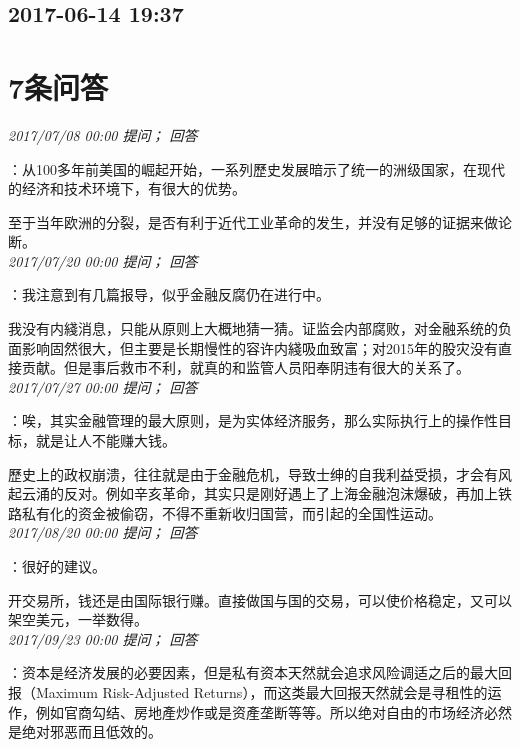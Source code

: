 \documentclass[twocolumn]{ctexart}
\begin{document}
\subsection{2017-06-14 19:37}


\section{7条问答}

\textit{\hfill\noindent\small 2017/07/08 00:00 提问； 回答}

：从100多年前美国的崛起开始，一系列歷史发展暗示了统一的洲级国家，在现代的经济和技术环境下，有很大的优势。

至于当年欧洲的分裂，是否有利于近代工业革命的发生，并没有足够的证据来做论断。\\

\textit{\hfill\noindent\small 2017/07/20 00:00 提问； 回答}

：我注意到有几篇报导，似乎金融反腐仍在进行中。

我没有内綫消息，只能从原则上大概地猜一猜。证监会内部腐败，对金融系统的负面影响固然很大，但主要是长期慢性的容许内綫吸血致富；对2015年的股灾没有直接贡献。但是事后救市不利，就真的和监管人员阳奉阴违有很大的关系了。\\

\textit{\hfill\noindent\small 2017/07/27 00:00 提问； 回答}

：唉，其实金融管理的最大原则，是为实体经济服务，那么实际执行上的操作性目标，就是让人不能赚大钱。

歷史上的政权崩溃，往往就是由于金融危机，导致士绅的自我利益受损，才会有风起云涌的反对。例如辛亥革命，其实只是刚好遇上了上海金融泡沫爆破，再加上铁路私有化的资金被偷窃，不得不重新收归国营，而引起的全国性运动。\\

\textit{\hfill\noindent\small 2017/08/20 00:00 提问； 回答}

：很好的建议。

开交易所，钱还是由国际银行赚。直接做国与国的交易，可以使价格稳定，又可以架空美元，一举数得。\\

\textit{\hfill\noindent\small 2017/09/23 00:00 提问； 回答}

：资本是经济发展的必要因素，但是私有资本天然就会追求风险调适之后的最大回报（Maximum Risk-Adjusted Returns），而这类最大回报天然就会是寻租性的运作，例如官商勾结、房地產炒作或是资產垄断等等。所以绝对自由的市场经济必然是绝对邪恶而且低效的。\\
\end{document}
